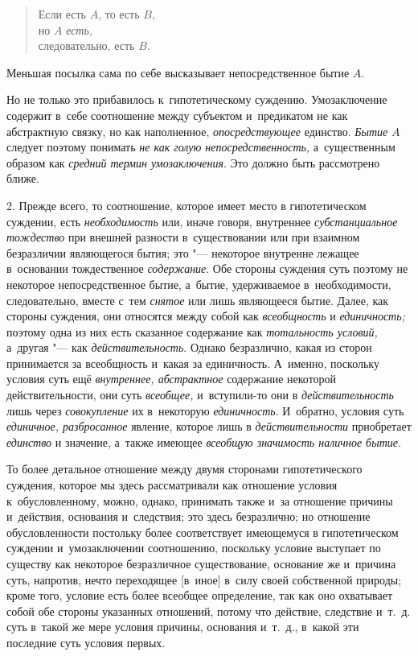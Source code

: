 \begin{verse}
Если есть $A$, то есть $B$,\\
но $A$ {\em есть,}\\
следовательно, есть $B$.
\end{verse}

Меньшая посылка сама по себе высказывает непосредственное бытие $A$.

Но не только это прибавилось к~гипотетическому суждению.
Умозаключение содержит в~себе соотношение между субъектом и~предикатом не
как абстрактную связку, но как наполненное, {\em опосредствующее}
единство. {\em Бытие} $A$ следует поэтому понимать
{\em не как голую непосредственность,} а~существенным образом как
{\em средний термин умозаключения}. Это должно быть рассмотрено ближе.

2. Прежде всего, то соотношение, которое имеет место в
гипотетическом суждении, есть {\em необходимость} или,
иначе говоря, внутреннее {\em субстанциальное тождество}
при внешней разности в~существовании или при
взаимном безразличии являющегося бытия; это "--- некоторое
внутренне лежащее в~основании тождественное {\em содержание}. Обе
стороны суждения суть поэтому не некоторое непосредственное бытие, а~бытие,
удерживаемое в~необходимости, следовательно, вместе с~тем {\em снятое} или лишь
являющееся бытие. Далее, как стороны суждения, они относятся между собой
как {\em всеобщность} и {\em единичность;}
поэтому одна из них есть сказанное содержание как
{\em тотальность условий,} а~другая "--- как {\em действительность}.
Однако безразлично, какая из сторон принимается за
всеобщность и~какая за единичность. А~именно, поскольку условия суть ещё
{\em внутреннее, абстрактное}
содержание некоторой действительности, они суть
{\em всеобщее,} и~вступили-то они в {\em действительность}
лишь через {\em совокупление} их в~некоторую {\em единичность}.
И~обратно, условия суть {\em единичное, разбросанное}
явление, которое лишь в {\em действительности} приобретает {\em единство} и
значение, а~также имеющее {\em всеобщую значимость наличное бытие}.

То более детальное отношение между двумя сторонами
гипотетического суждения, которое мы здесь рассматривали как отношение
условия к~обусловленному, можно, однако, принимать также и~за отношение
причины и~действия, основания и~следствия; это здесь безразлично; но
отношение обусловленности постольку более соответствует имеющемуся в
гипотетическом суждении и~умозаключении соотношению, поскольку условие
выступает по существу как некоторое безразличное существование, основание
же и~причина суть, напротив, нечто переходящее [в~иное] в~силу своей
собственной природы; кроме того, условие есть более всеобщее определение,
так как оно охватывает собой обе стороны указанных отношений, потому что
действие, следствие и~т.~д. суть в~такой же мере условия причины, основания
и~т.~д., в~какой эти последние суть условия первых.

